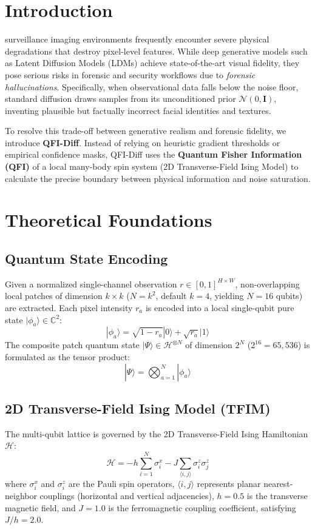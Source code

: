 \documentclass[10pt,journal,compsoc]{IEEEtran}
\begin{document}
\section{Introduction}
 surveillance imaging environments frequently encounter severe physical degradations that destroy pixel-level features. While deep generative models such as Latent Diffusion Models (LDMs) achieve state-of-the-art visual fidelity, they pose serious risks in forensic and security workflows due to \textit{forensic hallucinations}. Specifically, when observational data falls below the noise floor, standard diffusion draws samples from its unconditioned prior $\mathcal{N}(0, \mathbf{I})$, inventing plausible but factually incorrect facial identities and textures.

To resolve this trade-off between generative realism and forensic fidelity, we introduce \textbf{QFI-Diff}. Instead of relying on heuristic gradient thresholds or empirical confidence masks, QFI-Diff uses the \textbf{Quantum Fisher Information (QFI)} of a local many-body spin system (2D Transverse-Field Ising Model) to calculate the precise boundary between physical information and noise saturation.

\section{Theoretical Foundations}

\subsection{Quantum State Encoding}
Given a normalized single-channel observation $r \in [0, 1]^{H \times W}$, non-overlapping local patches of dimension $k \times k$ ($N = k^2$, default $k=4$, yielding $N=16$ qubits) are extracted. Each pixel intensity $r_a$ is encoded into a local single-qubit pure state $|\phi_a\rangle \in \mathbb{C}^2$:
\begin{equation}
|\phi_a\rangle = \sqrt{1 - r_a}|0\rangle + \sqrt{r_a}|1\rangle
\end{equation}
The composite patch quantum state $|\Psi\rangle \in \mathcal{H}^{\otimes N}$ of dimension $2^N$ ($2^{16} = 65{,}536$) is formulated as the tensor product:
\begin{equation}
|\Psi\rangle = \bigotimes_{a=1}^N |\phi_a\rangle
\end{equation}

\subsection{2D Transverse-Field Ising Model (TFIM)}
The multi-qubit lattice is governed by the 2D Transverse-Field Ising Hamiltonian $\mathcal{H}$:
\begin{equation}
\mathcal{H} = -h \sum_{i=1}^N \sigma_i^x - J \sum_{\langle i, j \rangle} \sigma_i^z \sigma_j^z
\end{equation}
where $\sigma_i^x$ and $\sigma_i^z$ are the Pauli spin operators, $\langle i, j \rangle$ represents planar nearest-neighbor couplings (horizontal and vertical adjacencies), $h = 0.5$ is the transverse magnetic field, and $J = 1.0$ is the ferromagnetic coupling coefficient, satisfying $J/h = 2.0$.
\end{document}
